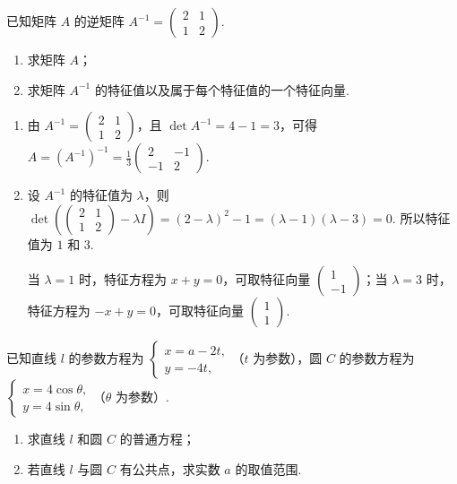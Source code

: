 \begin{problem}
已知矩阵 \(A\) 的逆矩阵 \(A^{-1} = \begin{pmatrix} 2 & 1 \\ 1 & 2 \end{pmatrix}\).

\begin{enumerate}
\item 求矩阵 \(A\)；
\item 求矩阵 \(A^{-1}\) 的特征值以及属于每个特征值的一个特征向量.
\end{enumerate}
\end{problem}

\begin{solution}
\begin{enumerate}
\item 由
\(A^{-1}=\begin{pmatrix}2&1\\1&2\end{pmatrix}\)，且 \(\det A^{-1}=4-1=3\)，可得
\(A=(A^{-1})^{-1}=\frac{1}{3}\begin{pmatrix}2&-1\\-1&2\end{pmatrix}\).

\item 设 \(A^{-1}\) 的特征值为 \(\lambda\)，则
\(\det\left(\begin{pmatrix}2&1\\1&2\end{pmatrix}-\lambda I\right)=(2-\lambda)^2-1=(\lambda-1)(\lambda-3)=0\).
所以特征值为 \(1\) 和 \(3\).

当 \(\lambda=1\) 时，特征方程为 \(x+y=0\)，可取特征向量 \(\begin{pmatrix}1\\-1\end{pmatrix}\)；当 \(\lambda=3\) 时，特征方程为 \(-x+y=0\)，可取特征向量 \(\begin{pmatrix}1\\1\end{pmatrix}\).
\end{enumerate}
\end{solution}

\begin{problem}
已知直线 \(l\) 的参数方程为 \(\begin{cases}
x=a-2t,\\
y=-4t,
\end{cases}\)（\(t\) 为参数），圆 \(C\) 的参数方程为 \(\begin{cases}
x=4\cos\theta,\\
y=4\sin\theta,
\end{cases}\)（\(\theta\) 为参数）.

\begin{enumerate}
\item 求直线 \(l\) 和圆 \(C\) 的普通方程；
\item 若直线 \(l\) 与圆 \(C\) 有公共点，求实数 \(a\) 的取值范围.
\end{enumerate}
\end{problem}

